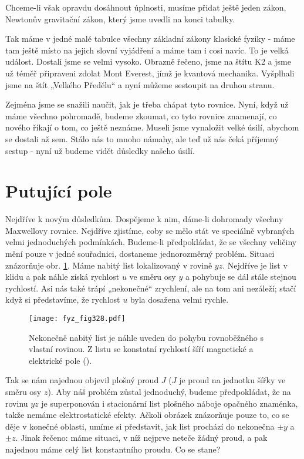 {  Chceme-li však opravdu dosáhnout úplnosti, musíme přidat ještě jeden zákon, Newtonův gravitační 
  zákon, který jsme uvedli na konci tabulky.

  Tak máme v jedné malé tabulce všechny základní zákony klasické fyziky - máme tam ještě místo 
  na jejich slovní vyjádření a máme tam i cosi navíc. To je velká událost. Dostali jsme se velmi 
  vysoko. Obrazně řečeno, jsme na štítu K2 a jsme už téměř připraveni zdolat Mont Everest, jímž je 
  kvantová mechanika. Vyšplhali jsme na štít „Velkého Předělu“ a nyní můžeme sestoupit na druhou 
  stranu.
  
  Zejména jsme se snažili naučit, jak je třeba chápat tyto rovnice. Nyní, když už máme všechno 
  pohromadě, budeme zkoumat, co tyto rovnice znamenají, co nového říkají o tom, co ještě neznáme. 
  Museli jsme vynaložit velké úsilí, abychom se dostali až sem. Stálo nás to mnoho námahy, ale teď 
  už nás čeká příjemný sestup - nyní už budeme vidět důsledky našeho úsilí.
  
\section{Putující pole}\label{fyz:IIchapXVIIIsecIII}
  Nejdříve k novým důsledkům. Dospějeme k nim, dáme-li dohromady všechny Maxwellovy rovnice. 
  Nejdříve zjistíme, coby se mělo stát ve speciálně vybraných velmi jednoduchých podmínkách. 
  Budemc-li předpokládat, že se všechny veličiny mění pouze v jedné souřadnici, dostaneme 
  jednorozměrný problém. Situaci znázorňuje obr. \ref{fyz:fig328}. Máme nabitý list lokalizovaný v 
  rovině \(yz\). Nejdříve je list v klidu a pak náhle získá rychlost \(u\) ve směru osy \(y\) a 
  pohybuje se dál stále stejnou rychlostí. Asi nás také trápí „nekonečné“ zrychlení, ale na tom ani 
  nezáleží; stačí když si představíme, že rychlost \(u\) byla dosažena velmi rychle.

  \begin{figure}[ht!]  %
    \centering
    \texttt{[image: fyz\_fig328.pdf]}
    \caption{Nekonečně nabitý list je náhle uveden do pohybu rovnoběžného s vlastní rovinou. Z listu
             se konstatní rychlostí šíří magnetické a elektrické pole
             (\cite[s.~323]{Feynman02}).}
    \label{fyz:fig328}
  \end{figure}

  Tak se nám najednou objevil plošný proud \(J\) (\(J\) je proud na jednotku šířky ve směru osy 
  \(z\)). Aby náš problém zůstal jednoduchý, budeme předpokládat, že na rovinu \(yz\) je 
  superponován i stacionární list plošného náboje opačného znaménka, takže nemáme elektrostatické 
  efekty. Ačkoli obrázek znázorňuje pouze to, co se děje v konečné oblasti, umíme si představit, 
  jak list prochází do nekonečna \(\pm y\) a \(\pm z\). Jinak řečeno: máme situaci, v níž nejprve 
  neteče žádný proud, a pak najednou máme celý list konstantního proudu. Co se stane?
  
}
